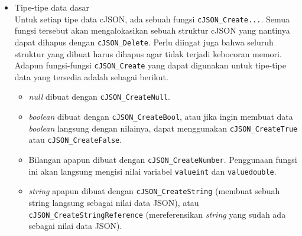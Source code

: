 \begin{itemize}
	\item Tipe-tipe data dasar\\
	Untuk setiap tipe data cJSON, ada sebuah fungsi \verb|cJSON_Create...|. Semua fungsi tersebut akan mengalokasikan sebuah struktur cJSON yang nantinya dapat dihapus dengan \verb|cJSON_Delete|. Perlu diingat juga bahwa seluruh struktur yang dibuat harus dihapus agar tidak terjadi kebocoran memori. Adapun fungsi-fungsi \verb|cJSON_Create| yang dapat digunakan untuk tipe-tipe data yang tersedia adalah sebagai berikut.
	
	\begin{itemize}
		\item \textit{null} dibuat dengan \verb|cJSON_CreateNull|.
		\item \textit{boolean} dibuat dengan \verb|cJSON_CreateBool|, atau jika ingin membuat data \textit{boolean} langsung dengan nilainya, dapat menggunakan \verb|cJSON_CreateTrue| atau \verb|cJSON_CreateFalse|.
		\item Bilangan apapun dibuat dengan \verb|cJSON_CreateNumber|. Penggunaan fungsi ini akan langsung mengisi nilai variabel \verb|valueint| dan \verb|valuedouble|.
		\item \textit{string} apapun dibuat dengan \verb|cJSON_CreateString| (membuat sebuah string langsung sebagai nilai data JSON), atau \verb|cJSON_CreateStringReference| (mereferensikan \textit{string} yang sudah ada sebagai nilai data JSON).
	\end{itemize}
	

\end{itemize}

